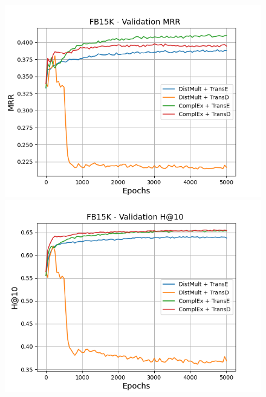 \begin{figure}
    \centering
    \begin{minipage}{.45\textwidth}
      \centering
      \includegraphics[width=0.9\linewidth]{figures/results/gan_train/pretrained/uncertainty/max/entropy/fb15k/5k_epochs/uncertainty_fb15k_mrrs.png}
    \end{minipage}%
    \begin{minipage}{.45\textwidth}
      \centering
      \includegraphics[width=0.9\linewidth]{figures/results/gan_train/pretrained/uncertainty/max/entropy/fb15k/5k_epochs/uncertainty_fb15k_hit10.png}
    \end{minipage}
    

\end{figure}
